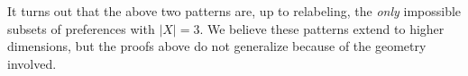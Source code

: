 \documentclass[12pt]{article}
\newtheorem*{definition}{Definition}
\newtheorem{conjecture}[theorem]{Conjecture}
\newcommand{\Rgz}{\mathbb{R}_{\ge 0}}
\newcommand{\1}[1]{\mathds{1}[{#1}]}
\begin{document}
  It turns out that the above two patterns are,
  up to relabeling, the \emph{only} impossible subsets
  of preferences with $|X|=3$.
  We believe these patterns extend to higher dimensions,
  but the proofs above do not generalize because of the geometry involved.






\end{document}
